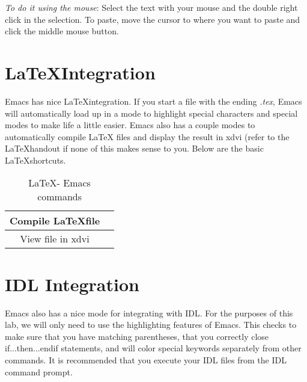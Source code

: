 \documentclass[preprint]{aastex}
\begin{document}
{\it To do it using the mouse}: Select the text with your mouse and
the double right click in the selection. To paste, move the cursor to
where you want to paste and click the middle mouse button. 

\section{\LaTeX Integration}
Emacs has nice \LaTeX integration. If you start a file with the ending
\emph{.tex}, Emacs will automatically load up in a mode to highlight
special characters and special modes to make life a little
easier. Emacs also has a couple modes to automatically compile \LaTeX
files and display the result in xdvi (refer to the \LaTeX handout if
none of this makes sense to you. Below are the basic \LaTeX shortcuts.

\begin{table}[h]
\begin{center}
\begin{tabular}{|c|c|} \hline
Compile \LaTeX file & \verb1C-c C-f1\\ \hline
View file in xdvi & \verb1C-c C-v1\\ \hline
\end{tabular}
\end{center}
\caption{\LaTeX - Emacs commands}
\end{table}

\section{IDL Integration}

Emacs also has a nice mode for integrating with IDL. For the purposes
of this lab, we will only need to use the highlighting features of
Emacs. This checks to make sure that you have matching parentheses,
that you correctly close if...then...endif statements, and will color
special keywords separately from other commands. It is recommended
that you execute your IDL files from the IDL command prompt. 
\end{document}
